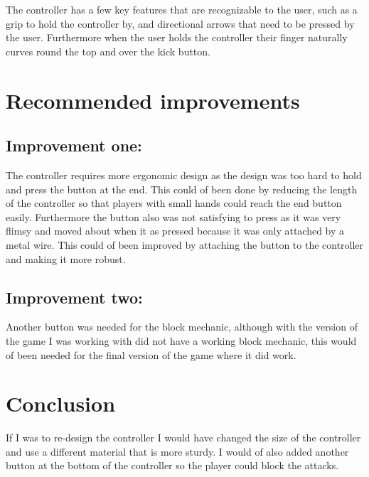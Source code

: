 \documentclass{scrartcl}
\begin{document}
The controller has a few key features that are recognizable to the user, such as a grip to hold the controller by, and directional arrows that need to be pressed by the user. Furthermore when the user holds the controller their finger naturally curves round the top and over the kick button.



\section{Recommended improvements}

\subsection{Improvement one:}
The controller requires more ergonomic design as the design was too hard to hold and press the button at the end. This could of been done by reducing the length of the controller so that players with small hands could reach the end button easily. Furthermore the button also was not satisfying to press as it was very flimsy and moved about when it as pressed because it was only attached by a metal wire. This could of been improved by attaching the button to the controller and making it more robust.

\subsection{Improvement two:}
Another button was needed for the block mechanic, although with the version of the game I was working with did not have a working block mechanic, this would of been needed for the final version of the game where it did work.


\section{Conclusion}

If I was to re-design the controller I would have changed the size of the controller and use a different material that is more sturdy. I would of also added another button at the bottom of the controller so the player could block the attacks.



\end{document}
